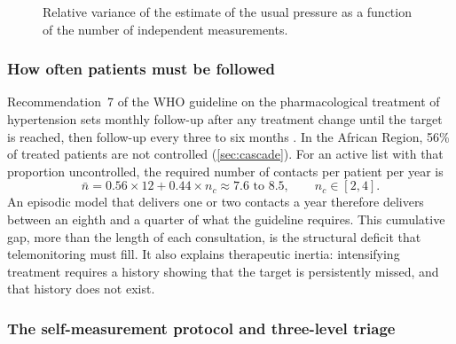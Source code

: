 \begin{figure}[htbp]
\centering
{}
\caption{Relative variance of the estimate of the usual pressure as a function of the number of independent measurements.}\label{fig:variability}
\end{figure}

\subsubsection{How often patients must be followed}\label{sec:followup-requires}

Recommendation~7 of the WHO guideline on the pharmacological treatment of hypertension sets monthly follow-up after any treatment change until the target is reached, then follow-up every three to six months \parencite{who2021guideline}. In the African Region, 56\% of treated patients are not controlled (\cref{sec:cascade}). For an active list with that proportion uncontrolled, the required number of contacts per patient per year is
\begin{equation}
  \bar n = 0.56 \times 12 + 0.44 \times n_c \approx 7.6 \text{ to } 8.5, \qquad n_c \in [2,4].
\end{equation}
An episodic model that delivers one or two contacts a year therefore delivers between an eighth and a quarter of what the guideline requires. This cumulative gap, more than the length of each consultation, is the structural deficit that telemonitoring must fill. It also explains therapeutic inertia: intensifying treatment requires a history showing that the target is persistently missed, and that history does not exist.

\subsubsection{The self-measurement protocol and three-level triage}\label{sec:protocols}\label{sec:triage}

